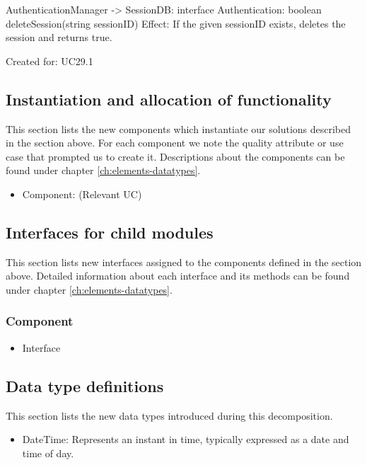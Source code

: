                 AuthenticationManager -> SessionDB: interface Authentication: boolean deleteSession(string sessionID)
                    Effect: If the given sessionID exists, deletes the session and returns true.
                    \item Created for: UC29.1


\subsection{Instantiation and allocation of functionality}
    This section lists the new components which instantiate our solutions
    described in the section above. For each component we note the quality
    attribute or use case that prompted us to create it. Descriptions about
    the components can be found under chapter \ref{ch:elements-datatypes}. \\

    \begin{itemize}
        \item Component: (Relevant UC)
    \end{itemize}


\subsection{Interfaces for child modules}
    This section lists new interfaces assigned to the components defined
    in the section above. Detailed information about each interface and
    its methods can be found under chapter \ref{ch:elements-datatypes}. \\

    \subsubsection{Component}
        \begin{itemize}
            \item Interface
        \end{itemize}

\subsection{Data type definitions}
    This section lists the new data types introduced during this decomposition.

    \begin{itemize}
        \item DateTime: Represents an instant in time, typically expressed as a date and time of day.
    \end{itemize}
